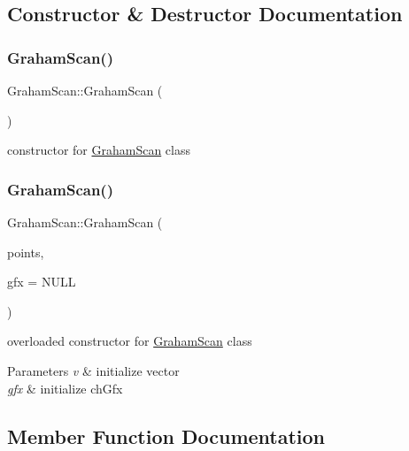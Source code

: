 \subsection{Constructor \& Destructor Documentation}
\mbox{\label{class_graham_scan_a207506a925528a889c377b39a24d879f}} 
\subsubsection{\texorpdfstring{GrahamScan()}{GrahamScan()}\hspace{0.1cm}{\footnotesize\ttfamily [1/2]}}
{\footnotesize\ttfamily Graham\+Scan\+::\+Graham\+Scan (\begin{DoxyParamCaption}{ }\end{DoxyParamCaption})}

constructor for \mbox{\hyperlink{class_graham_scan}{Graham\+Scan}} class \mbox{\label{class_graham_scan_afb51d5144cdee5df588528701b63de36}} 
\subsubsection{\texorpdfstring{GrahamScan()}{GrahamScan()}\hspace{0.1cm}{\footnotesize\ttfamily [2/2]}}
{\footnotesize\ttfamily Graham\+Scan\+::\+Graham\+Scan (\begin{DoxyParamCaption}\item[{std\+::vector$<$ \mbox{\hyperlink{class_point}{Point}} $>$ \&}]{points,  }\item[{\mbox{\hyperlink{class_convex_hull_graphix}{Convex\+Hull\+Graphix}} $\ast$}]{gfx = {\ttfamily NULL} }\end{DoxyParamCaption})}

overloaded constructor for \mbox{\hyperlink{class_graham_scan}{Graham\+Scan}} class 
\begin{DoxyParams}{Parameters}
{\em v} & initialize vector \\
\hline
{\em gfx} & initialize ch\+Gfx \\
\hline
\end{DoxyParams}


\subsection{Member Function Documentation}
\mbox{\label{class_graham_scan_a38ecf7b830f7923c4d889fa126349a7e}} 
